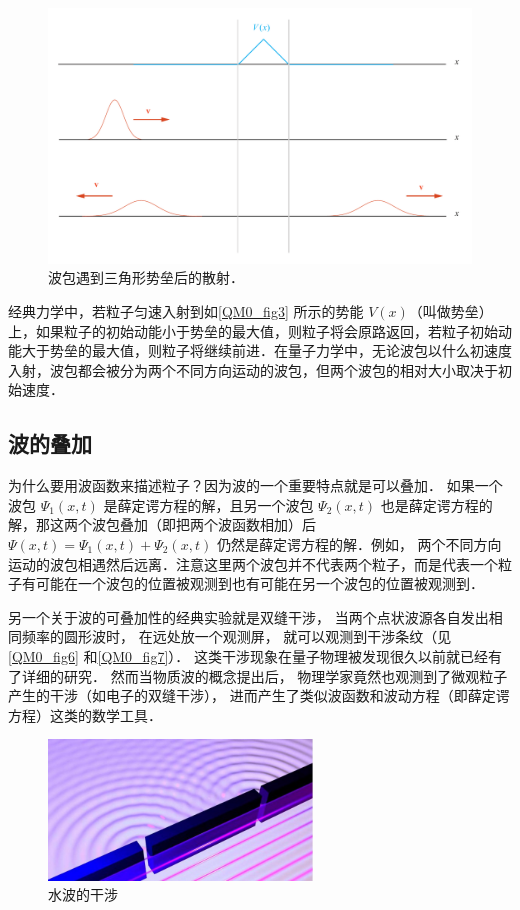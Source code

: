 \begin{figure}[ht]
\centering
\includegraphics[width=14cm]{./figures/QM03.pdf}
\caption{波包遇到三角形势垒后的散射．} \label{QM0_fig3}
\end{figure}

经典力学中，若粒子匀速入射到如\autoref{QM0_fig3} 所示的势能 $V(x)$（叫做势垒）上，如果粒子的初始动能小于势垒的最大值，则粒子将会原路返回，若粒子初始动能大于势垒的最大值，则粒子将继续前进．在量子力学中，无论波包以什么初速度入射，波包都会被分为两个不同方向运动的波包，但两个波包的相对大小取决于初始速度．

\subsection{波的叠加}
为什么要用波函数来描述粒子？因为波的一个重要特点就是可以叠加． 如果一个波包 $\Psi_1(x, t)$ 是薛定谔方程的解，且另一个波包 $\Psi_2(x, t)$ 也是薛定谔方程的解，那这两个波包叠加（即把两个波函数相加）后 $\Psi(x, t) = \Psi_1(x, t) + \Psi_2(x, t)$ 仍然是薛定谔方程的解．例如， 两个不同方向运动的波包相遇然后远离．注意这里两个波包并不代表两个粒子，而是代表一个粒子有可能在一个波包的位置被观测到也有可能在另一个波包的位置被观测到．

另一个关于波的可叠加性的经典实验就是双缝干涉， 当两个点状波源各自发出相同频率的圆形波时， 在远处放一个观测屏， 就可以观测到干涉条纹（见\autoref{QM0_fig6} 和\autoref{QM0_fig7}）． 这类干涉现象在量子物理被发现很久以前就已经有了详细的研究． 然而当物质波的概念提出后， 物理学家竟然也观测到了微观粒子产生的干涉（如电子的双缝干涉）， 进而产生了类似波函数和波动方程（即薛定谔方程）这类的数学工具．

\begin{figure}[ht]
\centering
\includegraphics[width=7cm]{./figures/QM06.png}
\caption{水波的干涉} \label{QM0_fig6}
\end{figure}

